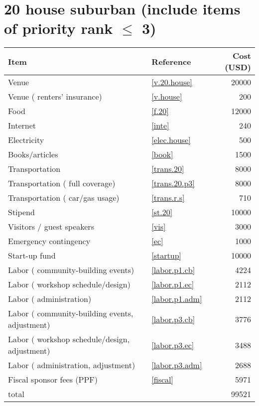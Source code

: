 \section*{20 house suburban (include items of priority rank $\leq$ 3)}
\begin{center}
\begin{tabular}{llr}
Item & Reference & Cost (USD) \\ \hline
Venue & \ref{v.20.house} & 20000 \\
Venue ( renters' insurance) & \ref{v.house} & 200 \\
Food & \ref{f.20} & 12000 \\
Internet & \ref{inte} & 240 \\
Electricity & \ref{elec.house} & 500 \\
Books/articles & \ref{book} & 1500 \\
Transportation & \ref{trans.20} & 8000 \\
Transportation ( full coverage) & \ref{trans.20.p3} & 8000 \\
Transportation ( car/gas usage) & \ref{trans.r.s} & 710 \\
Stipend & \ref{st.20} & 10000 \\
Visitors / guest speakers & \ref{vis} & 3000 \\
Emergency contingency & \ref{ec} & 1000 \\
Start-up fund & \ref{startup} & 10000 \\
Labor ( community-building events) & \ref{labor.p1.cb} & 4224 \\
Labor ( workshop schedule/design) & \ref{labor.p1.ec} & 2112 \\
Labor ( administration) & \ref{labor.p1.adm} & 2112 \\
Labor ( community-building events, adjustment) & \ref{labor.p3.cb} & 3776 \\
Labor ( workshop schedule/design, adjustment) & \ref{labor.p3.ec} & 3488 \\
Labor ( administration, adjustment) & \ref{labor.p3.adm} & 2688 \\
Fiscal sponsor fees (PPF) & \ref{fiscal} & 5971 \\ \hline
total &  & 99521
\end{tabular}
\end{center}
\newpage
